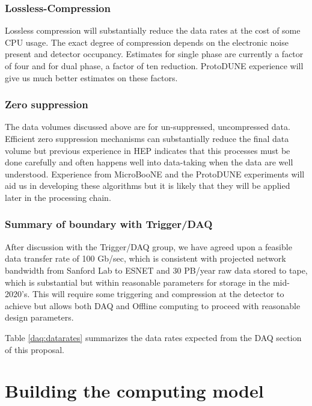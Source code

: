 \subsubsection{Lossless-Compression}

Lossless compression will substantially reduce the data rates at the cost of some CPU usage.  The exact degree of compression  depends on the electronic noise present and detector occupancy.  Estimates for single phase are currently a factor of four and for dual phase, a factor of ten reduction.  ProtoDUNE experience will give us much better estimates on these factors.


\subsubsection{Zero suppression}

The data volumes discussed above are for un-suppressed, uncompressed data.  Efficient zero suppression mechanisms can substantially reduce the final data volume but previous experience in HEP indicates that this processes must be done carefully and often happens well into data-taking when the data are well understood.  Experience from MicroBooNE and the ProtoDUNE experiments will aid us in developing these algorithms but it is likely that they will be applied later in the processing chain.  

\subsubsection{Summary of boundary with Trigger/DAQ}

After discussion with the Trigger/DAQ group, we have agreed upon a feasible data transfer rate of 100 Gb/sec, which is consistent with projected network bandwidth from Sanford Lab to ESNET and 30 PB/year raw data stored to tape, which is substantial but within reasonable parameters for storage in the mid-2020's.  This will require some triggering and compression at the detector to achieve but allows both DAQ and Offline computing to proceed with reasonable design parameters.

Table \ref{daq:datarates} summarizes the data rates expected from the DAQ section of this proposal. 



\section{Building the computing model}\label{sw:bld-cmp-mdl}

